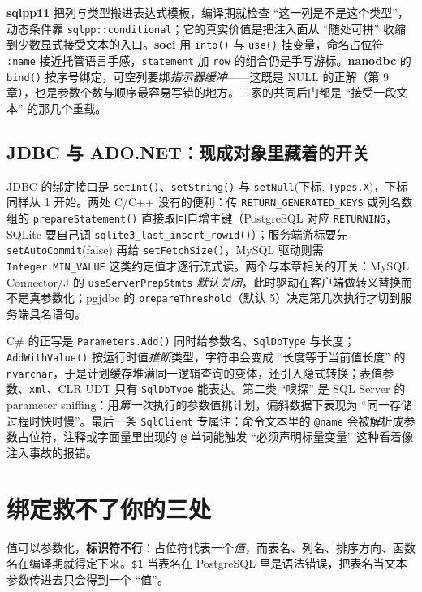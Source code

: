 \documentclass[12pt,a4paper,fontset=fandol]{ctexbook}
\newcommand{\Fn}[1]{\texttt{#1()}}
\newcommand{\Tp}[1]{\texttt{#1}}
\newcommand{\CSharp}{C\#}
\newcommand{\CppJava}{C/C++}
\begin{document}
\textbf{sqlpp11} 把列与类型搬进表达式模板，编译期就检查 ``这一列是不是这个类型''，动态条件靠 \Tp{sqlpp::\allowbreak conditional}；它的真实价值是把注入面从 ``随处可拼'' 收缩到少数显式接受文本的入口。\textbf{soci} 用 \Fn{into} 与 \Fn{use} 挂变量，命名占位符 \Tp{:name} 接近托管语言手感，\Tp{statement} 加 \Tp{row} 的组合仍是手写游标。\textbf{nanodbc} 的 \Fn{bind} 按序号绑定，可空列要绑\emph{指示器缓冲}——这既是 NULL 的正解（第 9 章），也是参数个数与顺序最容易写错的地方。三家的共同后门都是 ``接受一段文本'' 的那几个重载。

\subsection{JDBC 与 ADO.NET：现成对象里藏着的开关}

JDBC 的绑定接口是 \Fn{setInt}、\Fn{setString} 与 \Tp{setNull}(下标, \Tp{Types.X})，下标同样从 1 开始。两处 \CppJava{} 没有的便利：传 \Tp{RETURN\_\allowbreak GENERATED\_\allowbreak KEYS} 或列名数组的 \Fn{prepare\allowbreak Statement} 直接取回自增主键（PostgreSQL 对应 \texttt{RETURNING}，SQLite 要自己调 \Fn{sqlite3\_last\_insert\_rowid}）；服务端游标要先 \Tp{setAutoCommit}(false) 再给 \Fn{setFetchSize}，MySQL 驱动则需 \Tp{Integer.\allowbreak MIN\_\allowbreak VALUE} 这类约定值才逐行流式读。两个与本章相关的开关：MySQL Connector/J 的 \Tp{useServer\allowbreak PrepStmts} \emph{默认关闭}，此时驱动在客户端做转义替换而不是真参数化；pgjdbc 的 \Tp{prepareThreshold}（默认 5）决定第几次执行才切到服务端具名语句。

\CSharp{} 的正写是 \Fn{Parameters.Add} 同时给参数名、\Tp{SqlDbType} 与长度；\Fn{AddWithValue} 按运行时值\emph{推断}类型，字符串会变成 ``长度等于当前值长度'' 的 \Tp{nvarchar}，于是计划缓存堆满同一逻辑查询的变体，还引入隐式转换；表值参数、\Tp{xml}、CLR UDT 只有 \Tp{SqlDbType} 能表达。第二类 ``嗅探'' 是 SQL Server 的 parameter sniffing：用\emph{第一次}执行的参数值挑计划，偏斜数据下表现为 ``同一存储过程时快时慢''。最后一条 \Tp{SqlClient} 专属注：命令文本里的 \texttt{@name} 会被解析成参数占位符，注释或字面量里出现的 \texttt{@} 单词能触发 ``必须声明标量变量'' 这种看着像注入事故的报错。

\section{绑定救不了你的三处}

值可以参数化，\textbf{标识符不行}：占位符代表一个\emph{值}，而表名、列名、排序方向、函数名在编译期就得定下来。\texttt{\$1} 当表名在 PostgreSQL 里是语法错误，把表名当文本参数传进去只会得到一个 ``值''。
\end{document}
